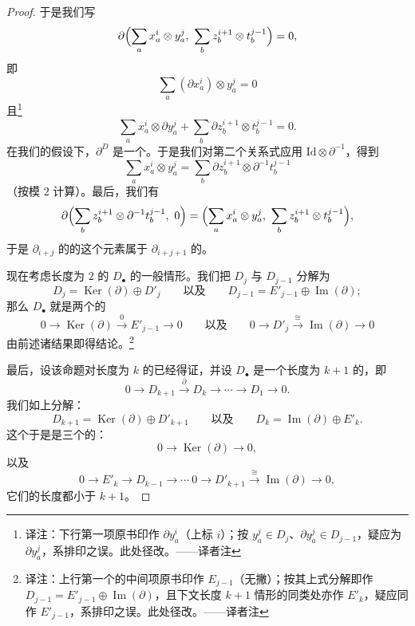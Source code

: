 \begin{proof}
于是我们写
\[
\partial \Bigl( \sum_a x_a^i \otimes y_a^j,\ \sum_b z_b^{i+1} \otimes t_b^{j-1} \Bigr) = 0,
\]
即
\[
\sum_a (\partial x_a^i) \otimes y_a^j = 0
\]
且\footnote{译注：下行第一项原书印作 $\partial y_a^{i}$（上标 $i$）；按 $y_a^j \in D_j$、$\partial y_a^j \in D_{j-1}$，疑应为 $\partial y_a^j$，系排印之误。此处径改。——译者注}
\[
\sum_a x_a^i \otimes \partial y_a^j + \sum_b \partial z_b^{i+1} \otimes t_b^{j-1} = 0.
\]
在我们的假设下，$\partial^D$ 是一个\trIsomorphism。于是我们对第二个关系式应用 $\mathrm{Id} \otimes \partial^{-1}$，得到
\[
\sum_a x_a^i \otimes y_a^j = \sum_b \partial z_b^{i+1} \otimes \partial^{-1} t_b^{j-1}
\]
（按模 $2$ 计算）。最后，我们有
\[
\partial \Bigl( \sum_b z_b^{i+1} \otimes \partial^{-1} t_b^{j-1},\ 0 \Bigr) = \Bigl( \sum_a x_a^i \otimes y_a^j,\ \sum_b z_b^{i+1} \otimes t_b^{j-1} \Bigr),
\]
于是 $\partial_{i+j}$ 的\trKernel{}的这个元素属于 $\partial_{i+j+1}$ 的\trImage{}。

现在考虑长度为 $2$ 的\trChainComplex{} $D_{\bullet}$ 的一般情形。我们把 $D_j$ 与 $D_{j-1}$ 分解为\trDirectSum
\[
D_j = \operatorname{Ker}(\partial) \oplus D'_j \qquad\text{以及}\qquad D_{j-1} = E'_{j-1} \oplus \operatorname{Im}(\partial);
\]
那么 $D_{\bullet}$ 就是两个\trChainComplex{}的\trDirectSum
\[
0 \longrightarrow \operatorname{Ker}(\partial) \xrightarrow{\ 0\ } E'_{j-1} \longrightarrow 0
\qquad\text{以及}\qquad
0 \longrightarrow D'_j \xrightarrow{\ \cong\ } \operatorname{Im}(\partial) \longrightarrow 0
\]
由前述诸结果即得结论。\footnote{译注：上行第一个\trComplex{}的中间项原书印作 $E_{j-1}$（无撇）；按其上式分解即作 $D_{j-1} = E'_{j-1} \oplus \operatorname{Im}(\partial)$，且下文长度 $k+1$ 情形的同类处亦作 $E'_k$，疑应同作 $E'_{j-1}$，系排印之误。此处径改。——译者注}

最后，设该命题对长度为 $k$ 的\trChainComplex{}已经得证，并设 $D_{\bullet}$ 是一个长度为 $k+1$ 的\trChainComplex，即
\[
0 \longrightarrow D_{k+1} \xrightarrow{\ \partial\ } D_k \longrightarrow \cdots \longrightarrow D_1 \longrightarrow 0.
\]
我们如上分解：
\[
D_{k+1} = \operatorname{Ker}(\partial) \oplus D'_{k+1} \qquad\text{以及}\qquad D_k = \operatorname{Im}(\partial) \oplus E'_k.
\]
这个\trChainComplex{}于是是三个\trComplex{}的\trDirectSum：
\[
0 \longrightarrow \operatorname{Ker}(\partial) \longrightarrow 0,
\]
以及
\[
0 \longrightarrow E'_k \longrightarrow D_{k-1} \longrightarrow \cdots\ 0 \longrightarrow D'_{k+1} \xrightarrow{\ \cong\ } \operatorname{Im}(\partial) \longrightarrow 0,
\]
它们的长度都小于 $k+1$。
\end{proof}

